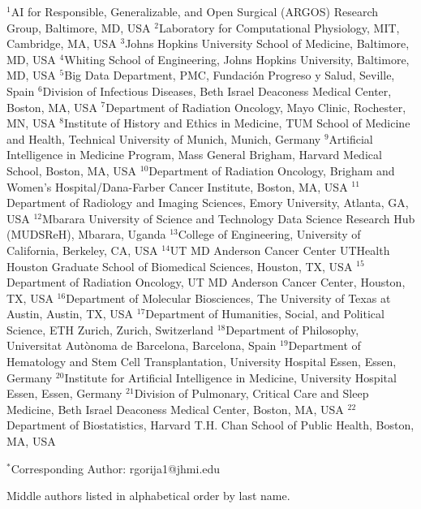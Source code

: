 \documentclass[11pt]{article}
\begin{document}
\begin{center}
{\scriptsize\setlength{\baselineskip}{7pt}
$^{1}$AI for Responsible, Generalizable, and Open Surgical (ARGOS) Research Group, Baltimore, MD, USA\enspace
$^{2}$Laboratory for Computational Physiology, MIT, Cambridge, MA, USA\enspace
$^{3}$Johns Hopkins University School of Medicine, Baltimore, MD, USA\enspace
$^{4}$Whiting School of Engineering, Johns Hopkins University, Baltimore, MD, USA\enspace
$^{5}$Big Data Department, PMC, Fundaci\'on Progreso y Salud, Seville, Spain\enspace
$^{6}$Division of Infectious Diseases, Beth Israel Deaconess Medical Center, Boston, MA, USA\enspace
$^{7}$Department of Radiation Oncology, Mayo Clinic, Rochester, MN, USA\enspace
$^{8}$Institute of History and Ethics in Medicine, TUM School of Medicine and Health, Technical University of Munich, Munich, Germany\enspace
$^{9}$Artificial Intelligence in Medicine Program, Mass General Brigham, Harvard Medical School, Boston, MA, USA\enspace
$^{10}$Department of Radiation Oncology, Brigham and Women's Hospital/Dana-Farber Cancer Institute, Boston, MA, USA\enspace
$^{11}$Department of Radiology and Imaging Sciences, Emory University, Atlanta, GA, USA\enspace
$^{12}$Mbarara University of Science and Technology Data Science Research Hub (MUDSReH), Mbarara, Uganda\enspace
$^{13}$College of Engineering, University of California, Berkeley, CA, USA\enspace
$^{14}$UT MD Anderson Cancer Center UTHealth Houston Graduate School of Biomedical Sciences, Houston, TX, USA\enspace
$^{15}$Department of Radiation Oncology, UT MD Anderson Cancer Center, Houston, TX, USA\enspace
$^{16}$Department of Molecular Biosciences, The University of Texas at Austin, Austin, TX, USA\enspace
$^{17}$Department of Humanities, Social, and Political Science, ETH Zurich, Zurich, Switzerland\enspace
$^{18}$Department of Philosophy, Universitat Aut\`onoma de Barcelona, Barcelona, Spain\enspace
$^{19}$Department of Hematology and Stem Cell Transplantation, University Hospital Essen, Essen, Germany\enspace
$^{20}$Institute for Artificial Intelligence in Medicine, University Hospital Essen, Essen, Germany\enspace
$^{21}$Division of Pulmonary, Critical Care and Sleep Medicine, Beth Israel Deaconess Medical Center, Boston, MA, USA\enspace
$^{22}$Department of Biostatistics, Harvard T.H. Chan School of Public Health, Boston, MA, USA
\par\vspace{0.2em}
$^{*}$Corresponding Author: rgorija1@jhmi.edu
\par
Middle authors listed in alphabetical order by last name.
}

\end{center}
\end{document}
